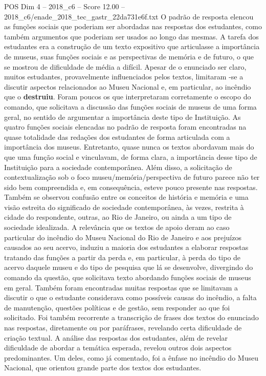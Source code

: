 \begin{textsample}{POS Dim 4 – 2018\_c6 – Score 12.00 – 2018\_c6/enade\_2018\_tec\_gastr\_22da731e6f.txt}
O padrão de resposta elencou as funções sociais que poderiam ser abordadas nas respostas dos estudantes, como também argumentos que poderiam ser usados ao longo das mesmas.
A tarefa dos estudantes era a construção de um texto expositivo que articulasse a importância de museus, suas funções sociais e as perspectivas de memória e de futuro, o que se mostrou de dificuldade de média a difícil.
Apesar de o enunciado ser claro, muitos estudantes, provavelmente influenciados pelos textos, limitaram -se a discutir aspectos relacionados ao Museu Nacional e, em particular, ao incêndio que o \textbf{destruiu}.
Foram poucos os que interpretaram corretamente o escopo do comando, que solicitava a discussão das funções sociais de museus de uma forma geral, no sentido de argumentar a importância deste tipo de Instituição.
As quatro funções sociais elencadas no padrão de resposta foram encontradas na quase totalidade das redações dos estudantes de forma articulada com a importância dos museus.
Entretanto, quase nunca os textos abordavam mais do que uma função social e vinculavam, de forma clara, a importância desse tipo de Instituição para a sociedade contemporânea.
Além disso, a solicitação de contextualização sob o foco museu/memória/perspectiva de futuro parece não ter sido bem compreendida e, em consequência, esteve pouco presente nas respostas.
Também se observou confusão entre os conceitos de história e memória e uma visão estreita do significado de sociedade contemporânea, às vezes, restrita à cidade do respondente, outras, ao Rio de Janeiro, ou ainda a um tipo de sociedade idealizada.
A relevância que os textos de apoio deram ao caso particular do incêndio do Museu Nacional do Rio de Janeiro e aos prejuízos causados ao seu acervo, induziu a maioria dos estudantes a elaborar respostas tratando das funções a partir da perda e, em particular, à perda do tipo de acervo daquele museu e do tipo de pesquisa que lá se desenvolve, divergindo do comando da questão, que solicitava texto abordando funções sociais de museus em geral.
Também foram encontradas muitas respostas que se limitavam a discutir o que o estudante considerava como possíveis causas do incêndio, a falta de manutenção, questões políticas e de gestão, sem responder ao que foi solicitado.
Foi também recorrente a transcrição de frases dos textos do enunciado nas respostas, diretamente ou por paráfrases, revelando certa dificuldade de criação textual.
A análise das respostas dos estudantes, além de revelar dificuldade de abordar a temática esperada, revelou outros dois aspectos predominantes.
Um deles, como já comentado, foi a ênfase no incêndio do Museu Nacional, que orientou grande parte dos textos dos estudantes.

\end{textsample}

